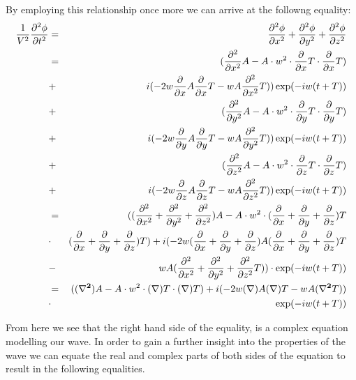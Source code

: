 \documentclass{mm2}
\begin{document}
\begin{answer}{2}
By employing this relationship once more we can arrive at the followng equality:
\begin{eqnarray}
\frac{1}{V^2}\frac{\partial^2 \phi}{\partial t^2}&=&\frac{\partial^2 \phi}{\partial x^2}+\frac{\partial^2 \phi}{\partial y^2}+
\frac{\partial^2 \phi}{\partial z^2}\\
&=& (\frac{\partial^2}{\partial x^2} A - A \cdot w^2 \cdot \frac{\partial }{\partial x}T \cdot \frac{\partial}{\partial x}T)\\ &+& i (-2w\frac{\partial }{\partial x}A\frac{\partial}{\partial x}T-wA\frac{\partial^2}{\partial x^2}T))\exp(-iw(t + T))\\ &+& (\frac{\partial^2}{\partial y^2} A - A \cdot w^2 \cdot \frac{\partial }{\partial y}T \cdot \frac{\partial}{\partial y}T)\\ &+& i (-2w\frac{\partial }{\partial y}A\frac{\partial}{\partial y}T-wA\frac{\partial^2}{\partial y^2}T))\exp(-iw(t + T))\\ &+& (\frac{\partial^2}{\partial z^2} A - A \cdot w^2 \cdot \frac{\partial }{\partial z}T \cdot \frac{\partial}{\partial z}T)\\ &+& i (-2w\frac{\partial }{\partial z}A\frac{\partial}{\partial z}T-wA\frac{\partial^2}{\partial z^2}T))\exp(-iw(t + T))\\
&=& ((\frac{\partial^2}{\partial x^2} + \frac{\partial^2}{\partial y^2} + \frac{\partial^2}{\partial z^2}) A - A \cdot w^2 \cdot (\frac{\partial }{\partial x} + \frac{\partial}{\partial y} + \frac{\partial}{\partial z}) T\\  &\cdot& (\frac{\partial}{\partial x} + \frac{\partial}{\partial y} + \frac{\partial}{\partial z})T) + i (-2w(\frac{\partial }{\partial x} + \frac{\partial }{\partial y} + \frac{\partial }{\partial z})A(\frac{\partial }{\partial x} + \frac{\partial }{\partial y} + \frac{\partial }{\partial z})T\\ &-& wA (\frac{\partial^2 }{\partial x^2} + \frac{\partial^2}{\partial y^2} + \frac{\partial^2}{\partial z^2}T))\cdot  \exp(-iw(t + T))\\ &=& (({\bf \nabla^2}) A - A \cdot w^2 \cdot ({\bf \nabla}) T  \cdot ({\bf \nabla})T) + i (-2w({\bf \nabla})A({\bf \nabla})T - wA ({\bf \nabla^2}T)) \\ &\cdot&  \exp(-iw(t + T))
\end{eqnarray}

From here we see that the right hand side of the equality, is a complex equation modelling our wave. In order to gain a further insight into the properties of the wave we can equate the real and complex parts of both sides of the equation to result in the following equalities.


\end{answer}
\end{document}
